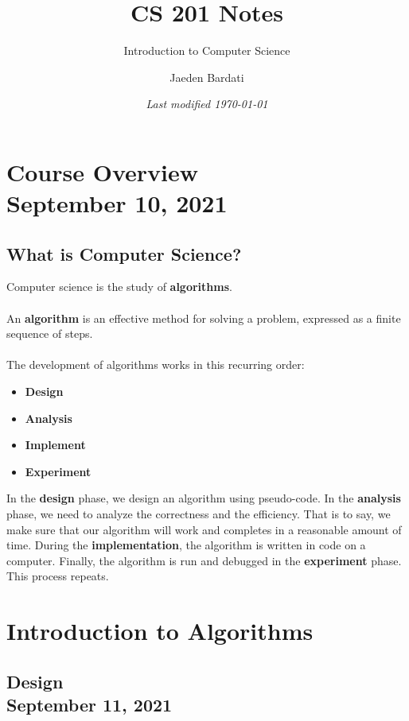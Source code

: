 \documentclass[]{article}
\title{CS 201 Notes}
\subtitle{Introduction to Computer Science}
\author{Jaeden Bardati}
\date{\textit{Last modified \today}}
\begin{document}
\maketitle
\bigbreak

\section{Course Overview\\ {\large \normalfont September 10, 2021}}
\bigbreak

\subsection{What is Computer Science?}
\bigbreak

Computer science is the study of \textbf{algorithms}.\\\\
An \textbf{algorithm} is an effective method for solving a problem, expressed as a finite sequence of steps.\\\\
The development of algorithms works in this recurring order:
\begin{itemize}
	\item \textbf{Design}
	\item \textbf{Analysis}
	\item \textbf{Implement}
	\item \textbf{Experiment}\smallskip
\end{itemize}

\noindent In the \textbf{design} phase, we design an algorithm using pseudo-code. In the \textbf{analysis} phase, we need to analyze the correctness and the efficiency. That is to say, we make sure that our algorithm will work and completes in a reasonable amount of time. During the \textbf{implementation}, the algorithm is written in code on a computer. Finally, the algorithm is run and debugged in the \textbf{experiment} phase. This process repeats.


\section{Introduction to Algorithms}
\bigbreak

\subsection{Design\\ {\normalfont September 11, 2021}}
\bigbreak
\end{document}
